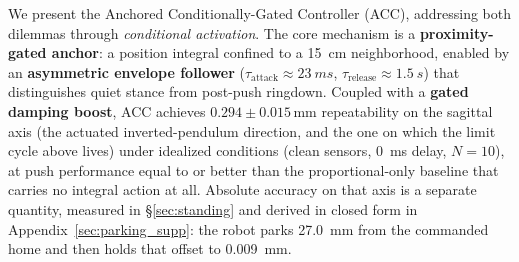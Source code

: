 \documentclass[conference]{IEEEtran}
\begin{document}
We present the Anchored Conditionally-Gated Controller (ACC), addressing both dilemmas through \emph{conditional activation}.
The core mechanism is a \textbf{proximity-gated anchor}: a position integral confined to a \SI{15}{cm} neighborhood, enabled by an \textbf{asymmetric envelope follower} ($\tau_{\text{attack}}{\approx}\SI{23}{ms}$, $\tau_{\text{release}}{\approx}\SI{1.5}{s}$) that distinguishes quiet stance from post-push ringdown.
Coupled with a \textbf{gated damping boost}, ACC achieves $0.294{\pm}0.015$\,mm repeatability on the sagittal axis (the actuated inverted-pendulum direction, and the one on which the limit cycle above lives) under idealized conditions (clean sensors, \SI{0}{ms} delay, $N{=}10$), at push performance equal to or better than the proportional-only baseline that carries no integral action at all. Absolute accuracy on that axis is a separate quantity, measured in \S\ref{sec:standing} and derived in closed form in Appendix~\ref{sec:parking_supp}: the robot parks \SI{27.0}{mm} from the commanded home and then holds that offset to \SI{0.009}{mm}.
\end{document}
